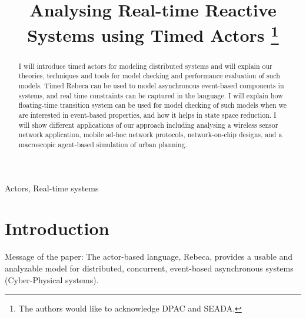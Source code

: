 \documentclass[conference]{IEEEtran}
\begin{document}
\title{Analysing Real-time Reactive Systems using Timed Actors
\thanks{The authors would like to acknowledge DPAC and SEADA.}
}

\author{
\and
{}
\and
{}
}

\maketitle

\begin{abstract}
I will introduce timed actors for modeling distributed systems and will explain our theories, techniques and tools for model checking and performance evaluation of such models. Timed Rebeca can be used to model asynchronous event-based components in systems, and real time constraints can be captured in the language. I will explain how floating-time transition system can be used for model checking of such models when we are interested in event-based properties, and how it helps in state space reduction. I will show different applications of our approach including analysing a wireless sensor network application, mobile ad-hoc network protocols, network-on-chip designs, and a macroscopic agent-based simulation of urban planning.
\end{abstract}

\begin{IEEEkeywords}
Actors, Real-time systems\end{IEEEkeywords}

\section{Introduction}

Message of the paper:
The actor-based language, Rebeca, provides a usable and analyzable model for distributed, concurrent, event-based asynchronous systems (Cyber-Physical systems).
\end{document}
